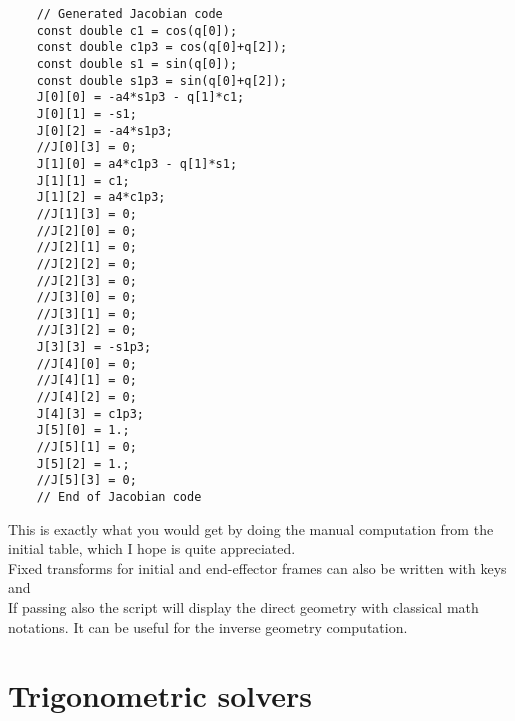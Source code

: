 \documentclass{ecnreport}
\begin{document}
  \begin{minipage}{.1\linewidth}
    \quad\quad
  \end{minipage}
  \begin{minipage}{.45\linewidth}
    \cppstyle \raggedright
    \begin{lstlisting}
    // Generated Jacobian code
    const double c1 = cos(q[0]);
    const double c1p3 = cos(q[0]+q[2]);
    const double s1 = sin(q[0]);
    const double s1p3 = sin(q[0]+q[2]);
    J[0][0] = -a4*s1p3 - q[1]*c1;
    J[0][1] = -s1;
    J[0][2] = -a4*s1p3;
    //J[0][3] = 0;
    J[1][0] = a4*c1p3 - q[1]*s1;
    J[1][1] = c1;
    J[1][2] = a4*c1p3;
    //J[1][3] = 0;
    //J[2][0] = 0;
    //J[2][1] = 0;
    //J[2][2] = 0;
    //J[2][3] = 0;
    //J[3][0] = 0;
    //J[3][1] = 0;
    //J[3][2] = 0;
    J[3][3] = -s1p3;
    //J[4][0] = 0;
    //J[4][1] = 0;
    //J[4][2] = 0;
    J[4][3] = c1p3;
    J[5][0] = 1.;
    //J[5][1] = 0;
    J[5][2] = 1.;
    //J[5][3] = 0;
    // End of Jacobian code
    \end{lstlisting}	
  \end{minipage}
  This is exactly what you would get by doing the manual computation from the initial table, which I hope is quite appreciated.\\
  
  Fixed transforms for initial and end-effector frames can also be written with keys  and \\
  
  If passing also  the script will display the direct geometry with classical math notations. It can be useful for the inverse geometry computation.
  
  \newpage
  \section{Trigonometric solvers}\label{trigsolve}
  
\end{document}
